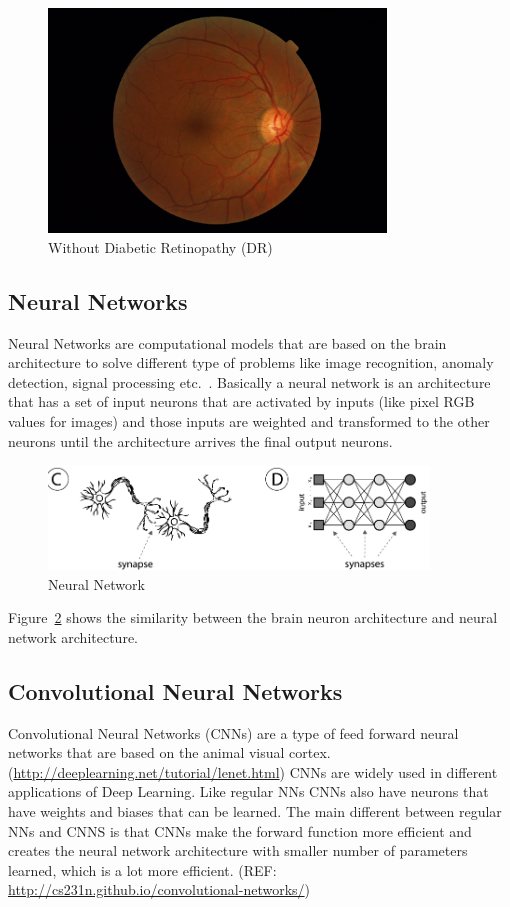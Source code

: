\begin{figure}[t]
\centering
\includegraphics[width=0.8\textwidth]{Figures/NODR}
\caption{Without Diabetic Retinopathy (DR)}
\label{fignoDR}
\end{figure}

\subsection{Neural Networks}
Neural Networks are computational models that are based on the brain architecture to solve different type of problems like image recognition, anomaly detection, signal processing etc.\ \citep{shiffman2012nature}. Basically a neural network is an architecture that has a set of input neurons that are activated by inputs (like pixel RGB values for images) and those inputs are weighted and transformed to the other neurons until the architecture arrives the final output neurons. 

\begin{figure}[b]
\centering
\includegraphics[width=0.9\textwidth]{Figures/nn}
\caption{Neural Network}
\label{fignn}
\end{figure}

Figure~\ref{fignn} shows the similarity between the brain neuron architecture and neural network architecture. 

\subsection{Convolutional Neural Networks}
Convolutional Neural Networks (CNNs) are a type of feed forward neural networks that are based on the animal visual cortex. (\url{http://deeplearning.net/tutorial/lenet.html}) CNNs are widely used in different applications of Deep Learning.
Like regular NNs CNNs also have neurons that have weights and biases that can be learned. The main different between regular NNs and CNNS is that CNNs make the forward function more efficient and creates the neural network architecture with smaller number of parameters learned, which is a lot more efficient. (REF: \url{http://cs231n.github.io/convolutional-networks/})

